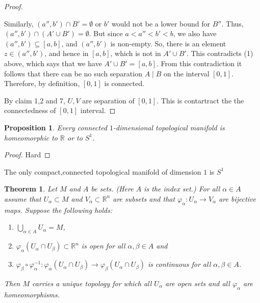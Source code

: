 \documentclass[
]{book}
\newtheorem{theorem}{Theorem}[chapter]
\newtheorem{proposition}{Proposition}[chapter]
\theoremstyle{definition}
\theoremstyle{definition}
\theoremstyle{definition}
\theoremstyle{definition}
\theoremstyle{remark}
\begin{document}
\begin{proof}
\begin{itemize}
  Similarly, \((a'',b') \cap B' = \emptyset\) or \(b'\) would not be a lower bound for \(B''\).
  Thus, \((a'',b') \cap (A' \cup B') = \emptyset\).
  But since \(a < a'' < b' < b\), we also have \((a'',b') \subseteq [a,b]\), and \((a'',b')\) is non-empty.
  So, there is an element \(z \in (a'',b')\), and hence in \([a,b]\), which is not in \(A' \cup B'\).
  This contradicts (1) above, which says that we have \(A' \cup B' = [a,b]\).
  From this contradiction it follows that there can be no such separation \(A \mid B\) on the interval \([0,1]\).
  Therefore, by definition, \([0,1]\) is connected.
\end{itemize}

By claim 1,2 and 7, \(U,V\) are separation of \([0,1]\). This is contartract the the connectedness of \([0,1]\) interval.
\end{proof}

\begin{proposition}
\protect\hypertarget{prp:unnamed-chunk-18}{}\label{prp:unnamed-chunk-18}Every connected \(1\)-dimensional topological manifold is homeomorphic to \(\mathbb{R}\) or to \(S^1\).
\end{proposition}

\begin{proof}
Hard
\end{proof}

The only compact,connected topological manifold of dimension \(1\) is \(S^1\)

\begin{theorem}
\protect\hypertarget{thm:110}{}\label{thm:110}Let \(M\) and \(A\) be sets. (Here \(A\) is the index set.) For all \(\alpha \in A\) assume that \(U_\alpha \subset M\) and \(V_\alpha \subset \mathbb{R}^n\) are subsets and that \(\varphi_\alpha : U_\alpha \rightarrow V_\alpha\) are bijective maps. Suppose the following holds:

\begin{enumerate}
\def\labelenumi{(\roman{enumi})}
\item
  \(\bigcup_{\alpha \in A} U_\alpha = M\),
\item
  \(\varphi_\alpha(U_\alpha \cap U_\beta) \subset \mathbb{R}^n\) is open for all \(\alpha, \beta \in A\) and
\item
  \(\varphi_\beta \circ \varphi_\alpha^{-1} : \varphi_\alpha(U_\alpha \cap U_\beta) \rightarrow \varphi_\beta(U_\alpha \cap U_\beta)\) is continuous for all \(\alpha, \beta \in A\).
\end{enumerate}

Then \(M\) carries a unique topology for which all \(U_\alpha\) are open sets and all \(\varphi_\alpha\) are homeomorphisms.
\end{theorem}
\end{document}
